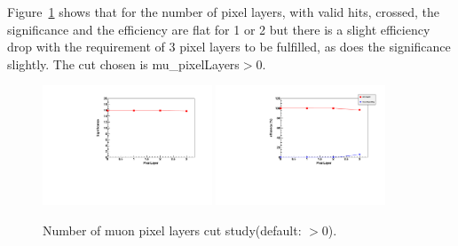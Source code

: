 Figure~\ref{fig:mu_pixelLayers} shows that for the number of pixel layers, with valid hits, crossed, the significance 
and the efficiency are flat for 1 or 2 but there is a slight efficiency drop with the requirement of 3 pixel layers to be fulfilled, 
as does the significance slightly. The cut chosen is mu\_pixelLayers$>0$. 
%



\begin{figure}[h!]
 \begin{center}
   \includegraphics[angle=0,width=0.45\textwidth]{chap_YInPbPbColl2011_figures/PixelLayer_Significance1} 
   \includegraphics[angle=0,width=0.45\textwidth]{chap_YInPbPbColl2011_figures/PixelLayer_SigBkgRejEff}
   \caption{Number of muon pixel layers cut study(default: $>0$).} 
   \label{fig:mu_pixelLayers}
\end{center}
\end{figure}



